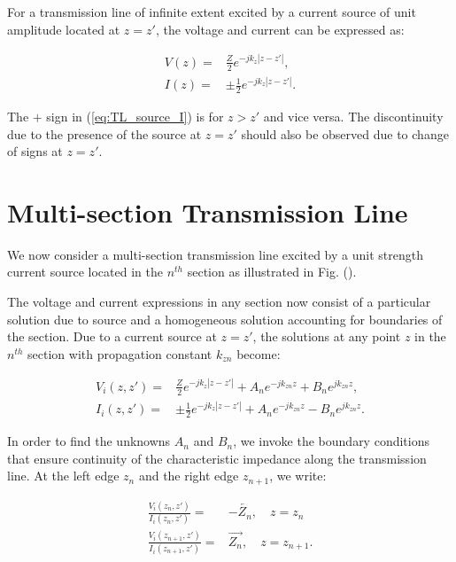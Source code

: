 \documentclass[11pt]{article}
\renewcommand{\^}{\hat}  %
\begin{document}
For a transmission line of infinite extent excited by a current source of unit amplitude located at $z = z'$, the voltage and current can be expressed as:

\begin{subequations}
  \begin{align}
    V(z) ={}& \frac{Z}{2} e^{-jk_z \left|z-z'\right| },
    \label{eq:TL_source_V}\\
    I(z) ={}& \pm \frac{1}{2} e^{-jk_z \left|z-z'\right|}.
    \label{eq:TL_source_I}
  \end{align}
  \label{eq:TL_source}
\end{subequations}

The $+$ sign in (\ref{eq:TL_source_I}) is for $z > z'$ and vice versa. The discontinuity due to the presence of the source at $z = z'$ should also be observed due to change of signs at $ z = z'$.

\section{Multi-section Transmission Line}

We now consider a multi-section transmission line excited by a unit strength current source located in the $n^{th}$ section as illustrated in Fig. ().

The voltage and current expressions in any section now consist of a particular solution due to source and a homogeneous solution accounting for boundaries of the section. Due to a current source at $z = z'$, the solutions at any point $z$ in the $n^{th}$ section with propagation constant $k_{zn}$ become:

\begin{subequations}
  \begin{align}
    V_i(z, z') ={}& \frac{Z}{2} e^{-jk_z \left|z-z'\right| } + A_n e^{-j k_{zn} z } + B_n e^{j k_{zn} z},
    \label{eq:multi_V}\\
    I_i(z, z') ={}& \pm \frac{1}{2} e^{-jk_z \left|z-z'\right|} + A_n e^{-j k_{zn} z } - B_n e^{j k_{zn} z}.
    \label{eq:multi_I}
  \end{align}
  \label{eq:multi}
\end{subequations}

In order to find the unknowns $A_n$ and $B_n$, we invoke the boundary conditions that ensure continuity of the characteristic impedance along the transmission line. At the left edge $z_n$ and the right edge $z_{n+1}$, we write:

\begin{subequations}
  \begin{align}
    \frac{V_i(z_n,z')}{I_i(z_n,z')} ={}& -\overleftarrow{Z_n} , \quad z = z_n
    \label{eq:BC_left}\\
    \frac{V_i(z_{n+1},z')}{I_i(z_{n+1},z')} ={}& \overrightarrow{Z_n} ,\quad  z = z_{n+1}.
    \label{eq:BC_right}
  \end{align}
  \label{eq:BC}
\end{subequations}
\end{document}
